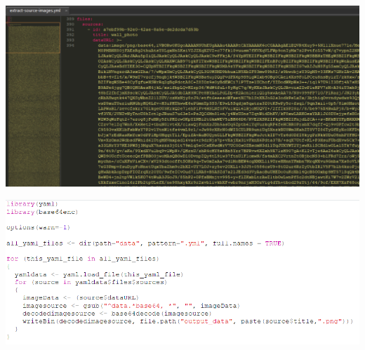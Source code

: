 \documentclass[unknownkeysallowed,usepdftitle=false, parskip=full, aspectratio=1610]{beamer}
\newcommand{\secvariable}{nothing}
\newcommand{\mysection}[1]{\renewcommand{\secvariable}{#1}
}
\begin{document}
\begin{frame}\label{\secvariable} %

\begin{center}

\includegraphics[width=1\textwidth,keepaspectratio]{figure/sublime_1.png}
\end{center}
\vfill

\end{frame}

\mysection{slab}
\begin{frame}\label{\secvariable}

\begin{center}
\includegraphics[width=1\textwidth,keepaspectratio]{figure/EXCRACT.PNG}
\end{center}

\end{frame}



\end{document}
